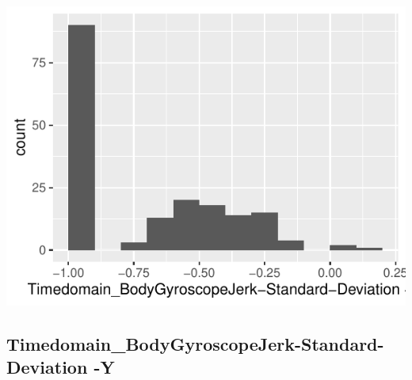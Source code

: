 \documentclass[
]{article}
\begin{document}
\begin{minipage}{0.25 \textwidth}

\includegraphics{codebook_tidydatasub_files/figure-latex/Var-30-Timedomain-BodyGyroscopeJerk-Standard-Deviation--X-1.pdf}

\end{minipage}

\noindent\makebox[\linewidth]{\rule{\textwidth}{0.4pt}}

\hypertarget{timedomain_bodygyroscopejerk-standard-deviation--y}{%
\subsection{Timedomain\_BodyGyroscopeJerk-Standard-Deviation
-Y}\label{timedomain_bodygyroscopejerk-standard-deviation--y}}
\end{document}
